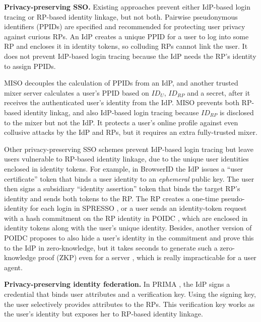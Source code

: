 \noindent\textbf{Privacy-preserving SSO.}
Existing approaches \cite{BrowserID, SPRESSO, NIST2017draft} prevent either IdP-based login tracing or RP-based identity linkage, but not both.
Pairwise pseudonymous identifiers (PPIDs) are specified \cite{OpenIDConnect, SAMLIdentifier} and recommended \cite{NIST2017draft}
for protecting user privacy against curious RPs.
An IdP creates a unique PPID for a user to log into some RP and encloses it in identity tokens, so colluding RPs cannot link the user.
It does not prevent IdP-based login tracing because the IdP needs the RP's identity to assign PPIDs.

MISO \cite{miso} decouples the calculation of PPIDs from an IdP,
        and another trusted mixer server calculates a user's PPID
    based on $ID_U$, $ID_{RP}$ and a secret,
    after it receives the authenticated user's identity from the IdP.
MISO prevents both RP-based identity linkag, %
    and also IdP-based login tracing because $ID_{RP}$ is disclosed to the mixer but not the IdP.
It protects a user's online profile against even collusive attacks by the IdP and RPs,
    but it requires an extra fully-trusted mixer.


Other privacy-preserving SSO schemes prevent IdP-based login tracing but leave users vulnerable to RP-based identity linkage, due to the unique user identities enclosed in identity tokens.
For example, in BrowserID \cite{BrowserID} 
the IdP %
issues a ``user certificate'' token that binds a user identity to an \emph{ephemeral} public key. The user then signs a subsidiary ``identity assertion'' token that binds the target RP's identity and sends both tokens to the RP.
The RP creates a one-time pseudo-identity for each login in SPRESSO \cite{SPRESSO}, 
 or a user sends an identity-token request with a hash commitment on the RP identity in POIDC \cite{POIDC,save-flow},
        which are enclosed in identity tokens along with the user's unique identity.
Besides, another version of POIDC \cite{POIDC} proposes to also hide a user's identity in the commitment and prove this to the IdP in zero-knowledge,
        but it takes seconds to generate such a zero-knowledge proof (ZKP) even for a server \cite{zkp-benchmark},
        which is really impracticable for a user agent.

\noindent\textbf{Privacy-preserving identity federation.}
In PRIMA \cite{prima}, the IdP signs a credential
that binds user attributes and a verification key. Using the signing key, the user selectively provides attributes to the RPs. This verification key works as the user's identity but exposes her to RP-based identity linkage.

